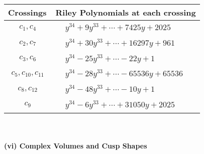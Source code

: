 \documentclass[1p]{elsarticle_modified}
\theoremstyle{definition}
\begin{document}
\begin{tabular}{m{50pt}|m{274pt}}
Crossings & \hspace{64pt}Riley Polynomials at each crossing \\
\hline $$\begin{aligned}c_{1},c_{4}\end{aligned}$$&$\begin{aligned}
&y^{34}+9 y^{33}+\cdots+7425 y+2025
\end{aligned}$\\
\hline $$\begin{aligned}c_{2},c_{7}\end{aligned}$$&$\begin{aligned}
&y^{34}+30 y^{33}+\cdots+16297 y+961
\end{aligned}$\\
\hline $$\begin{aligned}c_{3},c_{6}\end{aligned}$$&$\begin{aligned}
&y^{34}-25 y^{33}+\cdots-22 y+1
\end{aligned}$\\
\hline $$\begin{aligned}c_{5},c_{10},c_{11}\end{aligned}$$&$\begin{aligned}
&y^{34}-28 y^{33}+\cdots-65536 y+65536
\end{aligned}$\\
\hline $$\begin{aligned}c_{8},c_{12}\end{aligned}$$&$\begin{aligned}
&y^{34}-48 y^{33}+\cdots-10 y+1
\end{aligned}$\\
\hline $$\begin{aligned}c_{9}\end{aligned}$$&$\begin{aligned}
&y^{34}-6 y^{33}+\cdots+31050 y+2025
\end{aligned}$\\
\hline
\end{tabular}\\~\\
\newpage\flushleft \textbf{(vi) Complex Volumes and Cusp Shapes}
\end{document}
